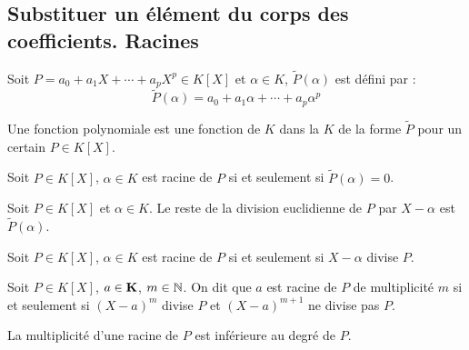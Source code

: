 \subsection{Substituer un élément du corps des coefficients. Racines}
\begin{defi}
 Soit $P = a_0+a_1X + \cdots +a_pX^p \in K[X]$ et $\alpha \in K$, $\widetilde{P}(\alpha)$ est défini par :
\begin{displaymath}
 \widetilde{P}(\alpha) = a_0+a_1\alpha + \cdots +a_p\alpha^p 
\end{displaymath}
\end{defi}
\begin{defi}
 Une fonction polynomiale est une fonction de $K$ dans la $K$ de la forme $\widetilde{P}$ pour un certain $P\in K[X]$.
\end{defi}
\begin{defi}[Racine]
 Soit $P\in K[X]$, $\alpha \in K$ est racine de $P$ si et seulement si $\widetilde{P}(\alpha)=0$.
\end{defi}
\begin{propn}
 Soit $P\in K[X]$ et $\alpha \in K$. Le reste de la division euclidienne de $P$ par $X-\alpha$ est $\widetilde{P}(\alpha)$.
\end{propn}

\begin{propn}
 Soit $P\in K[X]$, $\alpha \in K$ est racine de $P$ si et seulement si $X-\alpha$ divise $P$.
\end{propn}
\begin{defi}[multiplicité]
 Soit $P\in K[X]$, $a\in \mathbf{K}$, $m\in \mathbb{N}$. On dit que $a$ est racine de $P$ de multiplicité $m$ si et seulement si $(X-a)^m$ divise $P$ et $(X-a)^{m+1}$ ne divise pas $P$.  
\end{defi}
\begin{rem}
 La multiplicité d'une racine de $P$ est inférieure au degré de $P$. 
\end{rem}

